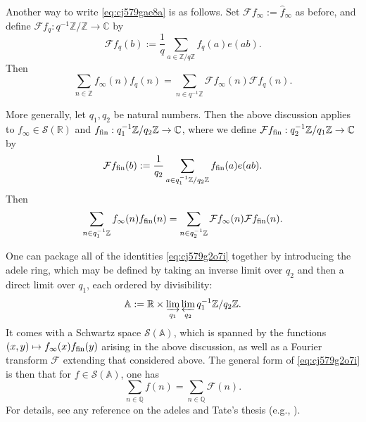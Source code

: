 \documentclass[reqno]{amsart}  \numberwithin{theorem}{section} \numberwithin{equation}{section}
\begin{document}
\begin{remark}\label{remark:cj579g6qey}
  Another way to write \eqref{eq:cj579gae8a} is as follows.  Set $\mathcal{F} f _\infty := \hat{f}_\infty$ as before, and define $\mathcal{F} f_q : q^{-1} \mathbb{Z} / \mathbb{Z} \rightarrow \mathbb{C}$ by
  \begin{equation*}
    \mathcal{F} f_q (b) := \frac{1}{q} \sum_{a \in \mathbb{Z} / q \mathbb{Z} } f_q(a) e(a b).
  \end{equation*}
  Then
  \begin{equation*}
    \sum_{n \in \mathbb{Z} } f _\infty (n) f_q (n)
    = \sum_{n \in q^{-1} \mathbb{Z} } \mathcal{F} f _\infty  (n) \mathcal{F} f_q (n).
  \end{equation*}
\end{remark}
\begin{remark}\label{remark:cj579g6sq5}
More generally, let $q_1, q_2$ be natural numbers.  Then the above discussion applies to $f_\infty \in \mathcal{S}(\mathbb{R})$ and $f_{\operatorname{fin}} : q_1^{-1} \mathbb{Z} / q_2 \mathbb{Z} \rightarrow \mathbb{C}$, where we define $\mathcal{F} f_{\operatorname{fin}} : q_2^{-1} \mathbb{Z} / q_1 \mathbb{Z} \rightarrow \mathbb{C}$ by
  \begin{equation*}
    \mathcal{F} f_{\operatorname{fin}} (b) :=
    \frac{1}{q_2 } \sum_{a \in q_1^{-1} \mathbb{Z} / q_2 \mathbb{Z} } f_{\operatorname{fin}} (a ) e (a b).
  \end{equation*}
  Then
  \begin{equation}\label{eq:cj579g2o7i}
    \sum_{n \in q_1^{-1} \mathbb{Z} } f _\infty (n) f_{\operatorname{fin}} (n)
    = \sum_{n \in q_2 ^{-1} \mathbb{Z} } \mathcal{F} f _\infty  (n) \mathcal{F} f_{\operatorname{fin}} (n).
  \end{equation}
\end{remark}
\begin{remark}\label{remark:cj579g604l}
  One can package all of the identities \eqref{eq:cj579g2o7i} together by introducing the adele ring, which may be defined by taking an inverse limit over $q_2$ and then a direct limit over $q_1$, each ordered by divisibility:
  \begin{equation*}
\mathbb{A} := \mathbb{R} \times \varinjlim_{q_1 } \varprojlim_{q_2 } q_1^{-1} \mathbb{Z}  / q_2 \mathbb{Z}.
  \end{equation*}
  It comes with a Schwartz space $\mathcal{S}(\mathbb{A})$, which is spanned by the functions $(x, y) \mapsto f _\infty (x) f_{\operatorname{fin}} (y)$ arising in the above discussion, as well as a Fourier transform $\mathcal{F}$ extending that considered above.  The general form of \eqref{eq:cj579g2o7i} is then that for $f \in \mathcal{S}(\mathbb{A})$, one has
  \begin{equation*}
\sum_{n \in \mathbb{Q} } f (n) = \sum_{n \in \mathbb{Q} } \mathcal{F} (n).
  \end{equation*}
  For details, see any reference on the adeles and Tate's thesis (e.g., \cite{MR1680912}).
\end{remark}
\end{document}
